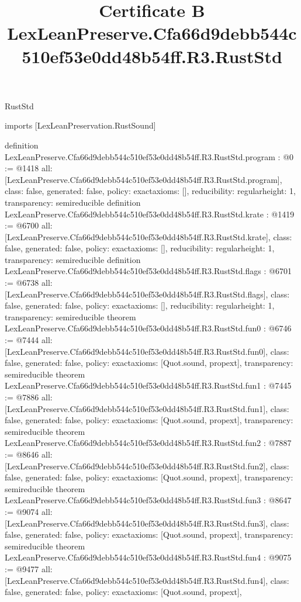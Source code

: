 \begin{lexlean}{RustStd}
\title{Certificate B LexLeanPreserve.Cfa66d9debb544c510ef53e0dd48b54ff.R3.RustStd}
\begin{coremodule}
imports [LexLeanPreservation.RustSound]

definition LexLeanPreserve.Cfa66d9debb544c510ef53e0dd48b54ff.R3.RustStd.program : @0 := @1418 {
  all: [LexLeanPreserve.Cfa66d9debb544c510ef53e0dd48b54ff.R3.RustStd.program],
  class: false,
  generated: false,
  policy: exact{axioms: []},
  reducibility: regular{height: 1},
  transparency: semireducible
}
definition LexLeanPreserve.Cfa66d9debb544c510ef53e0dd48b54ff.R3.RustStd.krate : @1419 := @6700 {
  all: [LexLeanPreserve.Cfa66d9debb544c510ef53e0dd48b54ff.R3.RustStd.krate],
  class: false,
  generated: false,
  policy: exact{axioms: []},
  reducibility: regular{height: 1},
  transparency: semireducible
}
definition LexLeanPreserve.Cfa66d9debb544c510ef53e0dd48b54ff.R3.RustStd.flags : @6701 := @6738 {
  all: [LexLeanPreserve.Cfa66d9debb544c510ef53e0dd48b54ff.R3.RustStd.flags],
  class: false,
  generated: false,
  policy: exact{axioms: []},
  reducibility: regular{height: 1},
  transparency: semireducible
}
theorem LexLeanPreserve.Cfa66d9debb544c510ef53e0dd48b54ff.R3.RustStd.fun0 : @6746 := @7444 {
  all: [LexLeanPreserve.Cfa66d9debb544c510ef53e0dd48b54ff.R3.RustStd.fun0],
  class: false,
  generated: false,
  policy: exact{axioms: [Quot.sound, propext]},
  transparency: semireducible
}
theorem LexLeanPreserve.Cfa66d9debb544c510ef53e0dd48b54ff.R3.RustStd.fun1 : @7445 := @7886 {
  all: [LexLeanPreserve.Cfa66d9debb544c510ef53e0dd48b54ff.R3.RustStd.fun1],
  class: false,
  generated: false,
  policy: exact{axioms: [Quot.sound, propext]},
  transparency: semireducible
}
theorem LexLeanPreserve.Cfa66d9debb544c510ef53e0dd48b54ff.R3.RustStd.fun2 : @7887 := @8646 {
  all: [LexLeanPreserve.Cfa66d9debb544c510ef53e0dd48b54ff.R3.RustStd.fun2],
  class: false,
  generated: false,
  policy: exact{axioms: [Quot.sound, propext]},
  transparency: semireducible
}
theorem LexLeanPreserve.Cfa66d9debb544c510ef53e0dd48b54ff.R3.RustStd.fun3 : @8647 := @9074 {
  all: [LexLeanPreserve.Cfa66d9debb544c510ef53e0dd48b54ff.R3.RustStd.fun3],
  class: false,
  generated: false,
  policy: exact{axioms: [Quot.sound, propext]},
  transparency: semireducible
}
theorem LexLeanPreserve.Cfa66d9debb544c510ef53e0dd48b54ff.R3.RustStd.fun4 : @9075 := @9477 {
  all: [LexLeanPreserve.Cfa66d9debb544c510ef53e0dd48b54ff.R3.RustStd.fun4],
  class: false,
  generated: false,
  policy: exact{axioms: [Quot.sound, propext]},
}
\end{coremodule}
\end{lexlean}
